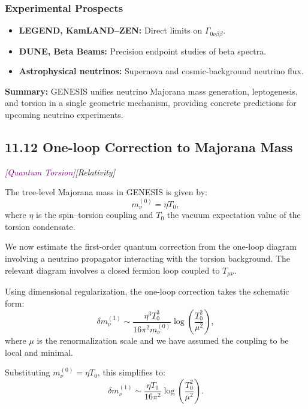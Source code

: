 \documentclass{article}
\newcommand{\quantumtag}{\textcolor{purple}{\textit{[Quantum Torsion]}}}
\newcommand{\grtag}{\textcolor{blue!40!black}{\textit{[Relativity]}}}
\begin{document}
\subsubsection{ Experimental Prospects}
\begin{itemize}
  \item \textbf{LEGEND, KamLAND–ZEN:} Direct limits on \(\Gamma_{0\nu\beta\beta}\).  
  \item \textbf{DUNE, Beta Beams:} Precision endpoint studies of beta spectra.  
  \item \textbf{Astrophysical neutrinos:} Supernova and cosmic‐background neutrino flux.
\end{itemize}

\noindent\textbf{Summary:}  
GENESIS unifies neutrino Majorana mass generation, leptogenesis, and torsion
in a single geometric mechanism, providing concrete predictions for upcoming
neutrino experiments.



\subsection*{11.12 One-loop Correction to Majorana Mass}
\quantumtag   \grtag


The tree-level Majorana mass in GENESIS is given by:
\begin{equation}
m_\nu^{(0)} = \eta T_0,
\end{equation}
where $\eta$ is the spin–torsion coupling and $T_0$ the vacuum expectation value of the torsion condensate.

We now estimate the first-order quantum correction from the one-loop diagram involving a neutrino propagator interacting with the torsion background. The relevant diagram involves a closed fermion loop coupled to $T_{\mu\nu}$.

Using dimensional regularization, the one-loop correction takes the schematic form:
\begin{equation}
\delta m_\nu^{(1)} \sim \frac{\eta^3 T_0^3}{16\pi^2 m_\nu^{(0)}} \log \left( \frac{T_0^2}{\mu^2} \right),
\end{equation}
where $\mu$ is the renormalization scale and we have assumed the coupling to be local and minimal.

Substituting $m_\nu^{(0)} = \eta T_0$, this simplifies to:
\begin{equation}
\delta m_\nu^{(1)} \sim \frac{\eta T_0}{16\pi^2} \log \left( \frac{T_0^2}{\mu^2} \right).
\end{equation}
\end{document}
